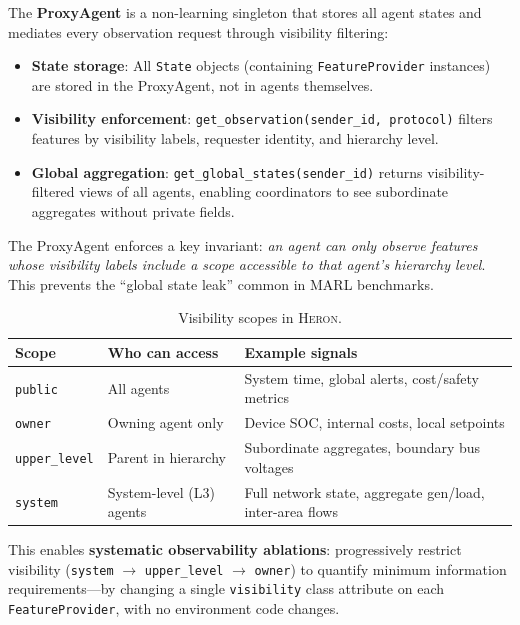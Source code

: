 \documentclass{article}
\newcommand{\heron}{\textsc{Heron}}
\begin{document}
The \textbf{ProxyAgent} is a non-learning singleton that stores all agent states and mediates every observation request through visibility filtering:
\begin{itemize}[nosep]
    \item \textbf{State storage}: All \texttt{State} objects (containing \texttt{FeatureProvider} instances) are stored in the ProxyAgent, not in agents themselves.
    \item \textbf{Visibility enforcement}: \texttt{get\_observation(sender\_id, protocol)} filters features by visibility labels, requester identity, and hierarchy level.
    \item \textbf{Global aggregation}: \texttt{get\_global\_states(sender\_id)} returns visibility-filtered views of all agents, enabling coordinators to see subordinate aggregates without private fields.
\end{itemize}

The ProxyAgent enforces a key invariant: \emph{an agent can only observe features whose visibility labels include a scope accessible to that agent's hierarchy level}. This prevents the ``global state leak'' common in MARL benchmarks.

\begin{table}[t]
\centering
\caption{Visibility scopes in \heron{}.}
\label{tab:visibility}
\small
\begin{tabular}{@{}lp{3.0cm}p{6.6cm}@{}}
\toprule
\textbf{Scope} & \textbf{Who can access} & \textbf{Example signals} \\
\midrule
\texttt{public} & All agents & System time, global alerts, cost/safety metrics \\
\texttt{owner} & Owning agent only & Device SOC, internal costs, local setpoints \\
\texttt{upper\_level} & Parent in hierarchy & Subordinate aggregates, boundary bus voltages \\
\texttt{system} & System-level (L3) agents & Full network state, aggregate gen/load, inter-area flows \\
\bottomrule
\end{tabular}
\end{table}

This enables \textbf{systematic observability ablations}: progressively restrict visibility (\texttt{system} $\rightarrow$ \texttt{upper\_level} $\rightarrow$ \texttt{owner}) to quantify minimum information requirements---by changing a single \texttt{visibility} class attribute on each \texttt{FeatureProvider}, with no environment code changes.
\end{document}
